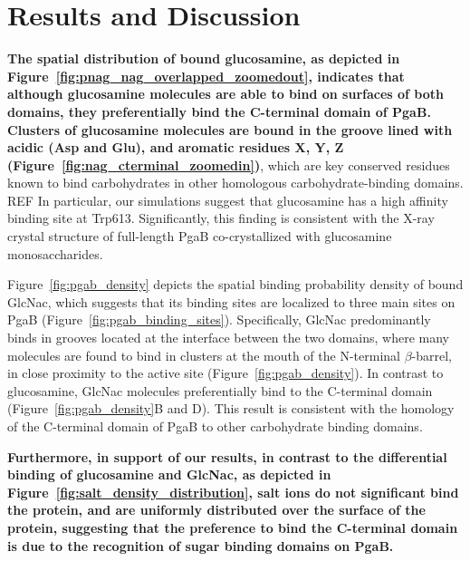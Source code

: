 \section{Results and Discussion}

\textbf{The spatial distribution of bound glucosamine, as depicted in Figure~\ref{fig:pnag_nag_overlapped_zoomedout}, indicates that although glucosamine molecules are able to bind on surfaces of both domains, they preferentially bind the C-terminal domain of PgaB. Clusters of glucosamine molecules are bound in the groove lined with acidic (Asp and Glu), and aromatic residues X, Y, Z (Figure~\ref{fig:nag_cterminal_zoomedin})}, which are key conserved residues known to bind carbohydrates in other homologous carbohydrate-binding domains. REF In particular, our simulations suggest that glucosamine has a high affinity binding site at Trp613. Significantly, this finding is consistent with the X-ray crystal structure of full-length PgaB co-crystallized with glucosamine monosaccharides.

Figure~\ref{fig:pgab_density} depicts the spatial binding probability density of bound GlcNac, which suggests that its binding sites are localized to three main sites on PgaB (Figure~\ref{fig:pgab_binding_sites}). Specifically, GlcNac predominantly binds in grooves located at the interface between the two domains, where many molecules are found to bind in clusters at the mouth of the N-terminal $\beta$-barrel, in close proximity to the active site (Figure~\ref{fig:pgab_density}).  In contrast to glucosamine, GlcNac molecules preferentially bind to the C-terminal domain (Figure~\ref{fig:pgab_density}B and D).  This result is consistent with the homology of the C-terminal domain of PgaB to other carbohydrate binding domains. 


\textbf{Furthermore, in support of our results, in contrast to the differential binding of glucosamine and GlcNac, as depicted in Figure~\ref{fig:salt_density_distribution}, salt ions do not significant bind the protein, and are uniformly distributed over the surface of the protein, suggesting that the preference to bind the C-terminal domain is due to the recognition of sugar binding domains on PgaB.}


